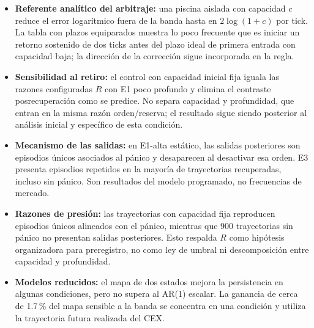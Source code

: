 \begin{itemize}
  \item \textbf{Referente analítico del arbitraje:} una piscina aislada con capacidad $c$ reduce el error logarítmico fuera de la banda hasta en $2\log(1+c)$ por tick. La tabla con plazos equiparados muestra lo poco frecuente que es iniciar un retorno sostenido de dos ticks antes del plazo ideal de primera entrada con capacidad baja; la dirección de la corrección sigue incorporada en la regla.
  \item \textbf{Sensibilidad al retiro:} el control con capacidad inicial fija iguala las razones configuradas $R$ con E1 poco profundo y elimina el contraste posrecuperación como se predice. No separa capacidad y profundidad, que entran en la misma razón orden/reserva; el resultado sigue siendo posterior al análisis inicial y específico de esta condición.
  \item \textbf{Mecanismo de las salidas:} en E1-alta estático, las salidas posteriores son episodios únicos asociados al pánico y desaparecen al desactivar esa orden. E3 presenta episodios repetidos en la mayoría de trayectorias recuperadas, incluso sin pánico. Son resultados del modelo programado, no frecuencias de mercado.
  \item \textbf{Razones de presión:} las trayectorias con capacidad fija reproducen episodios únicos alineados con el pánico, mientras que 900 trayectorias sin pánico no presentan salidas posteriores. Esto respalda $R$ como hipótesis organizadora para preregistro, no como ley de umbral ni descomposición entre capacidad y profundidad.
  \item \textbf{Modelos reducidos:} el mapa de dos estados mejora la persistencia en algunas condiciones, pero no supera al AR(1) escalar. La ganancia de cerca de 1.7\,\% del mapa sensible a la banda se concentra en una condición y utiliza la trayectoria futura realizada del CEX.
\end{itemize}
